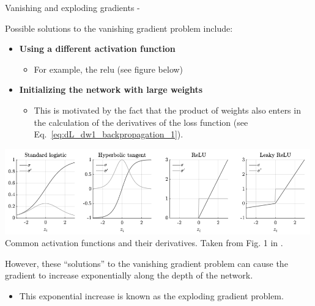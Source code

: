 \begin{frame}[t,allowframebreaks]{
    Vanishing and exploding gradients -}
    \framebreak


    Possible solutions to the 
    \gls{vanishing gradient} 
    problem include:

    \begin{itemize}
        \item {\bf Using a different activation function} 
        \begin{itemize}
            \small
            \item 
            For example, the \gls{relu} (see figure below)
        \end{itemize}
        \item {\bf Initializing the network with large weights}
        \begin{itemize}
            \small
            \item 
            This is motivated by the fact that the product of weights also enters in the
            calculation of the \glspl{derivative} of the 
            \gls{loss function}
            (see Eq.~\ref{eq:dL_dw1_backpropagation_1}).
        \end{itemize}
    \end{itemize}

    \begin{center}
        \includegraphics[width=0.99\textwidth]
            {./images/activation_functions/ostwald21_common_activation_functions_and_derivatives.png}\\
        {\tiny 
            Common activation functions and their derivatives.
            \color{col:attribution} 
            Taken from Fig. 1 in \cite{Ostwald:2021bpi}.\\
        }
    \end{center}        

    \framebreak


    However, these ``solutions'' to the
    \gls{vanishing gradient} problem
    can cause the \gls{gradient} 
    to increase exponentially 
    along the depth of the network.
    \begin{itemize}
    \item This exponential increase is known as the 
     \gls{exploding gradient} problem.\\
    \end{itemize}


\end{frame}
